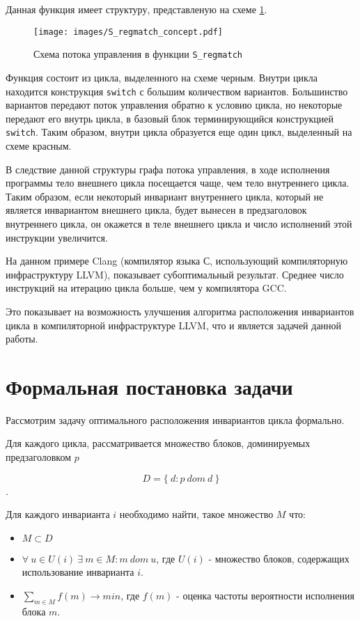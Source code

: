 Данная функция имеет структуру, представленую на схеме \ref{fig:S_regmatch_concept}.
\begin{figure}
    \centering
    \texttt{[image: images/S\_regmatch\_concept.pdf]}
    \caption{Схема потока управления в функции \texttt{S\_regmatch}}
    \label{fig:S_regmatch_concept}
\end{figure}

Функция состоит из цикла, выделенного на схеме черным.
Внутри цикла находится конструкция \texttt{switch} с большим количеством вариантов.
Большинство вариантов передают поток управления обратно к условию цикла, но некоторые передают его внутрь цикла, в базовый блок терминирующийся конструкцией \texttt{switch}.
Таким образом, внутри цикла образуется еще один цикл, выделенный на схеме красным.

В следствие данной структуры графа потока управления, в ходе исполнения программы тело внешнего цикла посещается чаще, чем тело внутреннего цикла.
Таким образом, если некоторый инвариант внутреннего цикла, который не является инвариантом внешнего цикла, будет вынесен в предзаголовок внутреннего цикла, он окажется в теле внешнего цикла и число исполнений этой инструкции увеличится.

На данном примере Clang (компилятор языка С, использующий компиляторную инфраструктуру LLVM), показывает субоптимальный результат.
Среднее число инструкций на итерацию цикла больше, чем у компилятора GCC.

Это показывает на возможность улучшения алгоритма расположения инвариантов цикла в компиляторной инфраструктуре LLVM, что и является задачей данной работы.

\section{Формальная постановка задачи}

Рассмотрим задачу оптимального расположения инвариантов цикла формально.

Для каждого цикла, рассматривается множество блоков, доминируемых предзаголовком $p$

$$D = \{ \: d : p \: dom \: d \: \}$$.

Для каждого инварианта $i$ необходимо найти, такое множество $M$ что:
\begin{itemize}
    \item $M \subset D$
    \item $\forall \: u \in U(i) \: \exists \: m \in M : m \: dom \: u $, где $U(i)$ - множество блоков, содержащих использование инварианта $i$.
    \item $\sum_{m \in M}{f(m)} \to min $, где $f(m)$ - оценка частоты вероятности исполнения блока $m$.
\end{itemize}
\newpage
